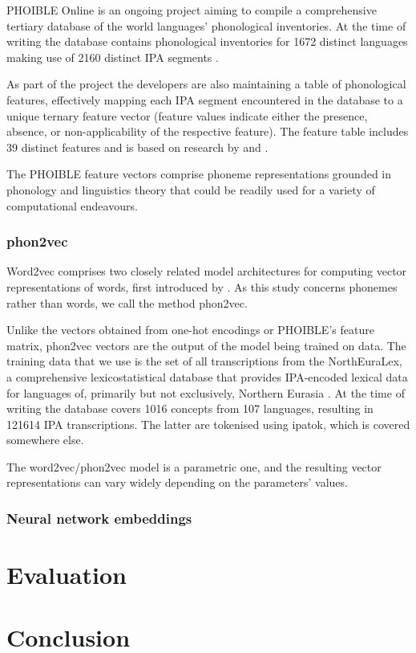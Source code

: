 \documentclass[a4paper]{report}
\begin{document}
PHOIBLE Online is an ongoing project aiming to compile a comprehensive tertiary database of the world languages' phonological inventories.
At the time of writing the database contains phonological inventories for 1672 distinct languages making use of 2160 distinct IPA segments \citep{2014_Moran_al}.

As part of the project the developers are also maintaining a table of phonological features,
effectively mapping each IPA segment encountered in the database to a unique ternary feature vector
(feature values indicate either the presence, absence, or non-applicability of the respective feature).
The feature table includes 39 distinct features and is based on research by \citet{2009_Bruce} and \citet{2011_Moisik_al}.

The PHOIBLE feature vectors comprise phoneme representations grounded in phonology and linguistics theory
that could be readily used for a variety of computational endeavours.


\subsection{phon2vec}

Word2vec comprises two closely related model architectures for computing vector representations of words, first introduced by \citet{2013_Mikolov_al}.
As this study concerns phonemes rather than words, we call the method phon2vec.

Unlike the vectors obtained from one-hot encodings or PHOIBLE's feature matrix, phon2vec vectors are the output of the model being trained on data.
The training data that we use is the set of all transcriptions from the NorthEuraLex,
a comprehensive lexicostatistical database that provides IPA-encoded lexical data for languages of, primarily but not exclusively, Northern Eurasia \citep{2017_Dellert_Jäger}.
At the time of writing the database covers 1016 concepts from 107 languages, resulting in 121614 IPA transcriptions.
The latter are tokenised using ipatok, which is covered somewhere else.

The word2vec/phon2vec model is a parametric one, and the resulting vector representations can vary widely depending on the parameters' values.


\subsection{Neural network embeddings}




\chapter{Evaluation}


\chapter{Conclusion}



\end{document}
